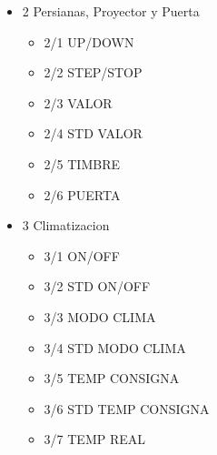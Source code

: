 \begin{multicols}{2} 
\begin{flushleft} 
\begin{itemize}
\item{2 Persianas, Proyector y Puerta}
\begin{itemize}
\item{2/1 UP/DOWN}
\item{2/2 STEP/STOP}
\item{2/3 VALOR}
\item{2/4 STD VALOR}
\item{2/5 TIMBRE}
\item{2/6 PUERTA}
\end{itemize} 
\end{itemize} 
\vspace{0.5cm}
\end{flushleft} 

\begin{flushright} 
\begin{itemize}
\item{3 Climatizacion}
\begin{itemize}
\item{3/1 ON/OFF}
\item{3/2 STD ON/OFF}
\item{3/3 MODO CLIMA}
\item{3/4 STD MODO CLIMA}
\item{3/5 TEMP CONSIGNA}
\item{3/6 STD TEMP CONSIGNA}
\item{3/7 TEMP REAL}
\end{itemize} 
\end{itemize} 
\end{flushright} 
\end{multicols} 


